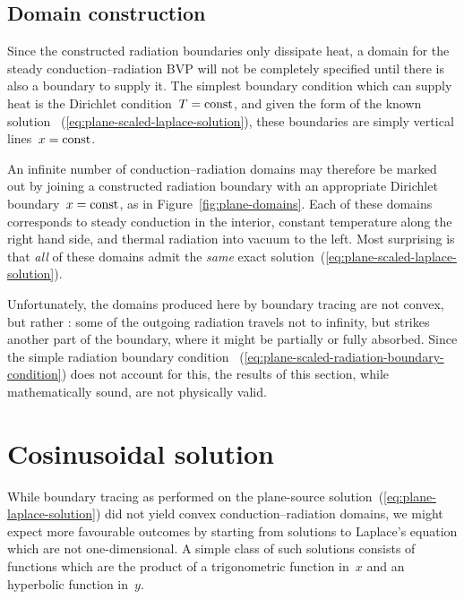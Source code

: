 \begin{figure}
\end{figure}

\subsection{Domain construction}
\label{sec:cartesian.plane.domain}

Since the constructed radiation boundaries only dissipate heat,
a domain for the steady conduction--radiation BVP
will not be completely specified
until there is also a boundary to supply it.
The simplest boundary condition which can supply heat
is the Dirichlet condition~$T = \mathrm{const}$,
and given the form of the known solution~%
  (\ref{eq:plane-scaled-laplace-solution}),
these boundaries are simply vertical lines~$x = \mathrm{const}$.

An infinite number of conduction--radiation domains
may therefore be marked out
by joining a constructed radiation boundary
with an appropriate Dirichlet boundary~$x = \mathrm{const}$,
as in Figure~\ref{fig:plane-domains}.
Each of these domains corresponds to steady conduction in the interior,
constant temperature along the right hand side,
and thermal radiation into vacuum to the left.
Most surprising is that \emph{all} of these domains
admit the \emph{same} exact solution~(\ref{eq:plane-scaled-laplace-solution}).

Unfortunately,
the domains produced here by boundary tracing are not convex,
but rather :
some of the outgoing radiation travels not to infinity,
but strikes another part of the boundary,
where it might be partially or fully absorbed.
Since the simple radiation boundary condition~%
  (\ref{eq:plane-scaled-radiation-boundary-condition})
does not account for this,
the results of this section,
while mathematically sound,
are not physically valid.

\section{Cosinusoidal solution}
\label{sec:cartesian.cosine}

While boundary tracing as performed on
the plane-source solution~(\ref{eq:plane-laplace-solution})
did not yield convex conduction--radiation domains,
we might expect more favourable outcomes
by starting from solutions to Laplace's equation
which are not one-dimensional.
A simple class of such solutions consists of functions which are the product
of a trigonometric function in~$x$ and an hyperbolic function in~$y$.

